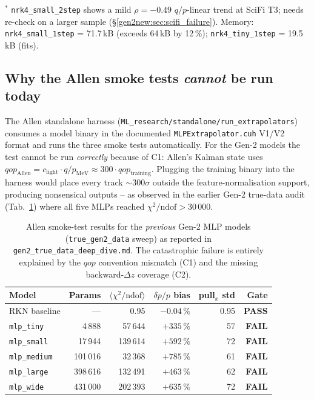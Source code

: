 \documentclass[a4paper,11pt]{article}
\begin{document}
\begin{table}[htbp]
\smallskip
\footnotesize
$^*$ \texttt{nrk4\_small\_2step} shows a mild $\rho=-0.49$ $q/p$-linear
trend at SciFi T3; needs re-check on a larger sample (§\ref{gen2new:sec:scifi_failure}).
Memory: \texttt{nrk4\_small\_1step} = 71.7\,kB (exceeds 64\,kB by 12\,\%);
\texttt{nrk4\_tiny\_1step} = 19.5\,kB (fits).
\end{table}

\subsection{Why the Allen smoke tests \emph{cannot} be run today}

The Allen standalone harness (\texttt{ML\_research/standalone/run\_extrapolators})
consumes a model binary in the documented
\texttt{MLPExtrapolator.cuh} V1/V2 format and runs the three smoke
tests automatically.  For the Gen-2 models the test cannot be run
\emph{correctly} because of C1: Allen's Kalman state uses
$qop_\text{Allen} = c_\text{light}\cdot q/p_\text{MeV} \approx
300\cdot qop_\text{training}$.  Plugging the training binary into the
harness would place every track $\sim\!300\sigma$ outside the
feature-normalisation support, producing nonsensical outputs -- as
observed in the earlier Gen-2 true-data audit (Tab.~\ref{gen2new:tab:allen_prev})
where all five MLPs reached $\chi^2/\text{ndof} > 30\,000$.

\begin{table}[htbp]
\centering
\caption{Allen smoke-test results for the \emph{previous} Gen-2 MLP
models (\texttt{true\_gen2\_data} sweep) as reported in
\texttt{gen2\_true\_data\_deep\_dive.md}. The catastrophic failure is
entirely explained by the $qop$ convention mismatch (C1) and the
missing backward-$\Delta z$ coverage (C2).}
\label{gen2new:tab:allen_prev}
\small
\begin{tabular}{l r r r r r}
\toprule
Model & Params & $\langle\chi^2/\text{ndof}\rangle$ & $\delta p/p$ bias & pull$_x$ std & Gate \\
\midrule
RKN baseline & --- & 0.95 & $-0.04\,\%$ & 0.95 & \textbf{PASS} \\
\texttt{mlp\_tiny}   & 4\,888   & 57\,644  & $+335\,\%$ & 57 & \textbf{FAIL} \\
\texttt{mlp\_small}  & 17\,944  & 139\,614 & $+592\,\%$ & 72 & \textbf{FAIL} \\
\texttt{mlp\_medium} & 101\,016 & 32\,368  & $+785\,\%$ & 61 & \textbf{FAIL} \\
\texttt{mlp\_large}  & 398\,616 & 132\,491 & $+463\,\%$ & 62 & \textbf{FAIL} \\
\texttt{mlp\_wide}   & 431\,000 & 202\,393 & $+635\,\%$ & 72 & \textbf{FAIL} \\
\bottomrule
\end{tabular}
\end{table}
\end{document}
